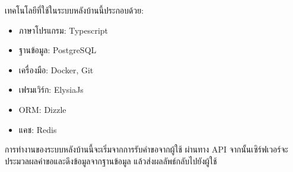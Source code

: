 เทคโนโลยีที่ใช้ในระบบหลังบ้านนี้ประกอบด้วย:
\begin{itemize}
    \item ภาษาโปรแกรม: Typescript \cite{typescript}
    \item ฐานข้อมูล: PostgreSQL \cite{postgresql}
    \item เครื่องมือ: Docker, Git \cite{git}
    \item เฟรมเวิร์ก: ElysiaJs \cite{elysiaJs}
    \item ORM: Dizzle \cite{dizzleORM}
    \item แคช: Redis \cite{redis}
\end{itemize}

การทำงานของระบบหลังบ้านนี้จะเริ่มจากการรับคำขอจากผู้ใช้ ผ่านทาง API จากนั้นเซิร์ฟเวอร์จะประมวลผลคำขอและดึงข้อมูลจากฐานข้อมูล แล้วส่งผลลัพธ์กลับไปยังผู้ใช้
\fi